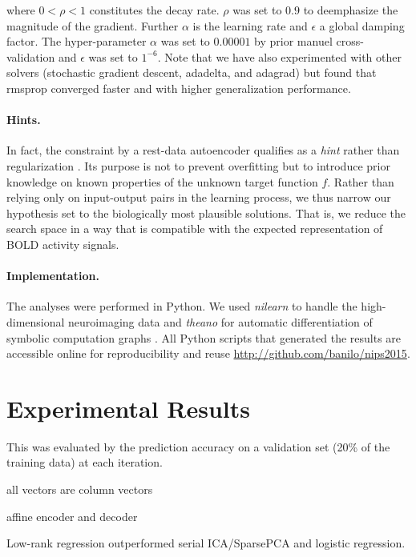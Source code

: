 \documentclass{article} %
\begin{document}
where $0 < \rho < 1$ constitutes the decay rate. $\rho$ was set to
$0.9$ to deemphasize the magnitude of the gradient.
Further $\alpha$ is the learning rate and $\epsilon$ a global damping factor.
The hyper-parameter $\alpha$ was set to $0.00001$ by prior manuel
cross-validation and $\epsilon$ was set to $1^{-6}$.
%
Note that we have also experimented with other solvers
(stochastic gradient descent, adadelta, and adagrad) but found that
rmsprop converged faster and with higher generalization performance.


\paragraph{Hints.}
In fact, the constraint by a rest-data autoencoder qualifies as a
\textit{hint} rather than regularization \cite{abu1994hints}.
Its purpose is not to prevent overfitting but to introduce
prior knowledge on known properties of the unknown target function $f$.
Rather than relying only on input-output pairs in the learning process,
we thus narrow our hypothesis set to the biologically most plausible solutions.
That is, we reduce the search space in a way that
is compatible with the expected representation of BOLD activity signals.


\paragraph{Implementation.}
The analyses were performed in Python.
We used \textit{nilearn} to handle
the high-dimensional neuroimaging data 
\cite{abrah14}
and
\textit{theano} for automatic
differentiation of symbolic computation graphs
\cite{bastien2012theano, bergstra2010theano}.
All Python scripts that generated the results are
accessible online for reproducibility and reuse
\url{http://github.com/banilo/nips2015}.



\section{Experimental Results}

This was evaluated by the prediction
accuracy on a validation set (20\% of the training data) at each iteration.

all vectors are column vectors

affine encoder and decoder

Low-rank regression outperformed serial ICA/SparsePCA and logistic regression.
\end{document}
